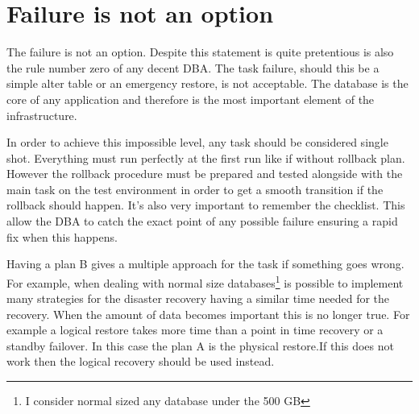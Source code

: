 \section{Failure is not an option}
The failure is not an option. Despite this statement is quite pretentious is also the rule number 
zero of any decent DBA. The task failure, should this be a simple alter table or an emergency 
restore, is not acceptable. The database is the core of any application and therefore is the most important 
element of the infrastructure.\newline

In order to achieve this impossible level, any task should be considered single shot. Everything must run 
perfectly at the first run like if without rollback plan. However the rollback procedure must be prepared 
and tested alongside with the main task on the test environment in order to get a smooth transition if the 
rollback should happen. It's also very important to remember the checklist. This allow the DBA to catch the 
exact point of any possible failure ensuring a rapid fix when this happens.\newline

Having a plan B gives a multiple approach for the task if something goes wrong. For example, when dealing 
with normal size databases\footnote{I consider normal sized any database under the 500 GB} is possible to 
implement many strategies for the disaster recovery having a similar time needed for the recovery. When the 
amount of data becomes important this is no longer true. For example a logical restore takes more time than 
a point in time recovery or a standby failover. In this case the plan A is the physical restore.If this does 
not work then the logical recovery should be used instead.

